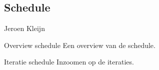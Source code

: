 \begin{frame}
    \section{Schedule}

    Jeroen Kleijn
\end{frame}

\begin{frame}[label=schedule1]{Overview schedule}
    Een overview van de schedule.
\end{frame}

\begin{frame}[label=schedule1]{Iteratie schedule}
    Inzoomen op de iteraties.
\end{frame}
